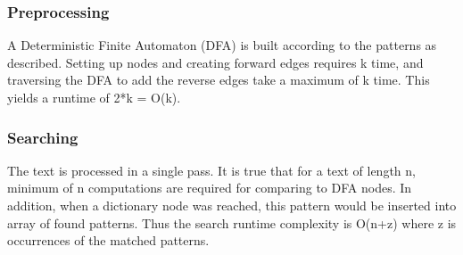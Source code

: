 \documentclass[paper=a4, fontsize=11pt]{scrartcl} %
\numberwithin{equation}{section} %
\numberwithin{figure}{section} %
\numberwithin{table}{section} %
\begin{document}
\subsubsection{Preprocessing}

A Deterministic Finite Automaton (DFA) is built according to the patterns as described. Setting up nodes and creating forward edges requires k time, and traversing the DFA to add the reverse edges take a maximum of k time. This yields a runtime of 2*k = O(k). 

\subsubsection{Searching}

The text is processed in a single pass. It is true that for a text of length n, minimum of n computations are required for comparing to DFA nodes. In addition, when a dictionary node was reached, this pattern would be inserted into array of found patterns. Thus the search runtime complexity is O(n+z) where z is occurrences of the matched patterns. 

\newpage
{}
\nocite{*}
\end{document}

